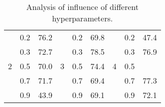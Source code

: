 \documentclass[journal]{IEEEtran}
\begin{document}
\begin{table}[t]
	\renewcommand\arraystretch{1.1}
	\centering
	\caption{Analysis of influence of different hyperparameters.}
	\begin{tabular}{c|cc|c|cc|c|cc}
		\toprule
		     &    & &    &    &  & 	   &  &    \\
		\midrule
		\multirow{5}{*}{2} & 0.2 &76.2& \multirow{5}{*}{3} &0.2 &69.8 & \multirow{5}{*}{4} & 0.2 & 47.4 \\
								 & 0.3 & 72.7 &                    		   & 0.3 & 78.5 &                    			& 0.3 & 76.9\\ 
								 & 0.5 & 70.0 &                    		   & 0.5 & 74.4 &                    			& 0.5 &  \\ 
								 & 0.7 & 71.7 &                   		   & 0.7 & 69.4 &                    			& 0.7 & 77.3 \\ 
								 & 0.9 & 43.9 &                   		   & 0.9 & 69.1 &                    			& 0.9 & 72.1 \\
\bottomrule
	\end{tabular}
\label{Table5}
\end{table}
\end{document}
